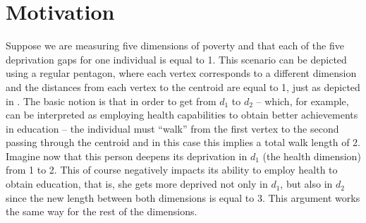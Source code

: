 \documentclass[english, a4paper,12pt]{article}
\begin{document}
\section{Motivation} \label{sec:motivation}
%
Suppose we are measuring five dimensions of poverty and that each of the five deprivation gaps for one individual is equal to 1. 
This scenario can be depicted using a regular pentagon, where each vertex corresponds to a different dimension and the distances from each vertex to the centroid are equal to 1, just as depicted in . The basic notion is that in order to get from $d_{1}$ to $d_{2}$ -- which, for example, can be interpreted as employing health capabilities to obtain better achievements in education -- the individual must ``walk'' from the first vertex to the second passing through the centroid and in this case this implies a total walk length of 2. Imagine now that this person deepens its deprivation in $d_{1}$ (the health dimension) from 1 to 2. This of course negatively impacts its ability to employ health to obtain education, that is, she gets more deprived not only in $d_{1}$, but also in $d_{2}$ since the new length between both dimensions is equal to 3. This argument works the same way for the rest of the dimensions.
\end{document}
